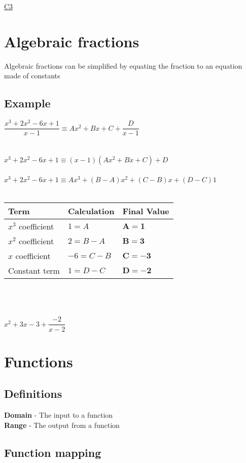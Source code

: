 \documentclass{article}[18pt]
\begin{document}
\begin{center}
\underline{\huge C3}
\end{center}
\section{Algebraic fractions}
Algebraic fractions can be simplified by equating the fraction to an equation made of constants
\subsection{Example}
$\dfrac{x^3+2x^2-6x+1}{x-1}\equiv Ax^2+Bx+C+\dfrac{D}{x-1}$\\
\\
\\
$x^3+2x^2-6x+1\equiv(x-1)(Ax^2+Bx+C)+D$\\
\\
$x^3+2x^2-6x+1\equiv Ax^3+(B-A)x^2+(C-B)x+(D-C)1$\\
\\
\begin{tabularx}{\textwidth}{|X|X|X|}
\hline
Term&Calculation&Final Value\\
\hline
$x^3$ coefficient&$1=A$&$\mathbf{A=1}$\\
\hline
$x^2$ coefficient&$2=B-A$&$\mathbf{B=3}$\\
\hline
$x$ coefficient&$-6=C-B$&$\mathbf{C=-3}$\\
\hline
Constant term&$1=D-C$&$\mathbf{D=-2}$\\
\hline
\end{tabularx}
\\
\\
\\
$x^2+3x-3+\dfrac{-2}{x-2}$
\section{Functions}
\subsection{Definitions}
\textbf{Domain} - The input to a function\\
\textbf{Range} - The output from a function
\subsection{Function mapping}
\end{document}
